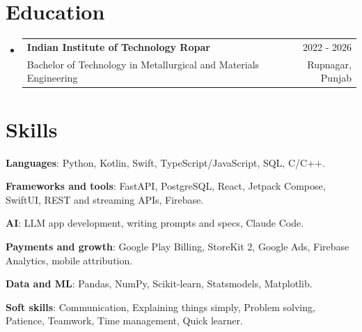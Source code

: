 \documentclass[letterpaper,11pt]{article}
\makeatletter
\newcommand{\resumeSubheading}[4]{
  \vspace{-2pt}\item
    \begin{tabular*}{0.97\textwidth}[t]{l@{\extracolsep{\fill}}r}
      \textbf{#1} & #2 \\
      #3 & #4 \\
    \end{tabular*}\vspace{-7pt}
}
\newcommand{\resumeSubHeadingListStart}{\begin{itemize}[leftmargin=0.15in, label={}]}
\newcommand{\resumeSubHeadingListEnd}{\end{itemize}}
\makeatother
\begin{document}
\section{\textbf{Education}}
  \resumeSubHeadingListStart
    \resumeSubheading
      {Indian Institute of Technology Ropar}{2022 - 2026}
      {Bachelor of Technology in Metallurgical and Materials Engineering}{Rupnagar, Punjab}
  \resumeSubHeadingListEnd
\vspace{-5mm}

\section{\textbf{Skills}}
\begin{itemize}[leftmargin=0.15in, label={}]
    \small{\item \textbf{Languages}: Python, Kotlin, Swift, TypeScript/JavaScript, SQL, C/C++.
\vspace{-3mm}
    \item \textbf{Frameworks and tools}: FastAPI, PostgreSQL, React, Jetpack Compose, SwiftUI, REST and streaming APIs, Firebase.
\vspace{-3mm}
    \item \textbf{AI}: LLM app development, writing prompts and specs, Claude Code.
\vspace{-3mm}
    \item \textbf{Payments and growth}: Google Play Billing, StoreKit 2, Google Ads, Firebase Analytics, mobile attribution.
\vspace{-3mm}
    \item \textbf{Data and ML}: Pandas, NumPy, Scikit-learn, Statsmodels, Matplotlib.
\vspace{-3mm}
    \item \textbf{Soft skills}: Communication, Explaining things simply, Problem solving, Patience, Teamwork, Time management, Quick learner.}
\end{itemize}
\vspace{-5mm}

\end{document}
